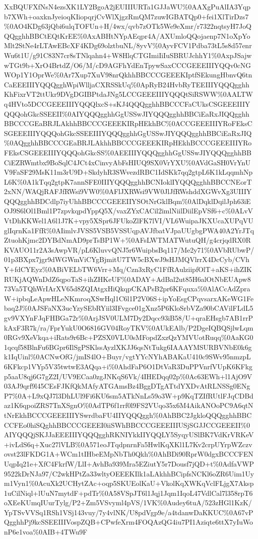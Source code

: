 \documentclass[]{article}
\begin{document}
XxBQUFXfNsN4ezsXK1LY2BgoA2jEUIIIURTa1GJJaWU\%0AAXgPuAlIA3Yqpb7XWh+oaxknJyeioqKIiopqrjCvWlXjgzRmQM7zuwIGBATQp0+fei1XlTirDzs7\%0AO4KDg63jQbi6ulqTOFUn+H/4wx/qvb7zOTk5We9eXmr/r7322nqtsyH7JoQQQgghhBBCtEQtKrEE\%0AxABHtNYpAEqpr4A/AXUmloQQojaenp7N1oXpYoMlt2StNe4rLTAwEBcXF4KDg69olztbuNL/8yvV\%0AyvFCV1Pdba73tL5s8d57enrWu6t1U/g91C83N7cr8sTNlqahn4+W8HlqCTGImiIiIuSBRUJchhY1\%0AxpJSajwwTGt9b+XrO4BrtdZ/O6/M/cD9AGFhYdEnTpywSaxCCCGEEEIIIYQQv0cNGWOp1Y1OprWe\%0Ar7Xup7XuV98nrQkhhBBCCCGEEEKIptfSEkungHbnvQ6tnCaEEEIIIYQQQgghWpiWlljaCXRSSkUq\%0ApRyB24HvbRyTEEIIIYQQQgghhKhFixrVT2ttUkr9DVgDGIBPtdaJNg5LCCGEEEIIIYQQQtSiRSWW\%0AALTWq4HVto5DCCGEEEIIIYQQQlxcS+sKJ4QQQgghhBBCCCFaCUksCSGEEEIIIYQQQohGkcSSEEII\%0AIYQQQgghhGgUSSwJIYQQQgghhBBCiEaRxJIQQgghhBBCCCGEaBRJLAkhhBBCCCGEEEKIRpHEkhBC\%0ACCGEEEIIIYRoFEksCSGEEEIIIYQQQohGkcSSEEIIIYQQQgghhGgUSSwJIYQQQgghhBBCiEaRxJIQ\%0AQgghhBBCCCGEaBRJLAkhhBBCCCGEEEKIRpHEkhBCCCGEEEIIIYRoFEksCSGEEEIIIYQQQohGkcSS\%0AEEIIIYQQQgghhGgUSSwJIYQQQgghhBBCiEZRWmtbx9BoSqlC4JCt4xCinvyAbFsHIUQ9SX0VrYXU\%0AVdGaSH0VrYnUV9FaSF29MsK11m3rU9D+SkdyhR3SWvezdRBC1IdSKk7qq2gtpL6K1kLqqmhNpL6K\%0A1kTqq2gtpK7annSFE0IIIYQQQgghhBCNIoklIYQQQgghhBBCCNEorT2xNN/WAQjRAFJfRWsi9VW0\%0AFlJXRWsi9VW0JlJfRWshddXGWvXg3UIIIYQQQgghhBDCdlp7iyUhhBBCCCGEEEIIYSOtNrGklBqm\%0AlDqklDqilJph63iEOJ9S6lOl1Bml1P7zpvkqpdYppQ5X/vaxZYxCACil2imlNiilDiilEpVSf6+c\%0ALvVVtDhKKWel1A6l1J7K+vpy5XSpr6JFUkoZlFK7lVI/VL6WuipaJKXUcaXUPqVUglIqrnKa1FfR\%0AIimlvJVSS5VSB5VSSUqpAVJfbatVJpaUUgbgPWA40A2YrJTqZtuohKjmc2DYBdNmAD9prTsBP1W+\%0AFsLWTMATWutuQH/g4crjqdRX0RKVAUO11r2A3sAwpVR/pL6KluvvQNJ5r6WuipbsBq117/Me2y71\%0AVbRUbwP/01p3BXpx7jgr9dWGWmViCYgBjmitU7TW5cBXwJ9sHJMQVlrrX4DcCyb/CVhY+fdCYEyz\%0ABiVELbTW6Vrr+Mq/Czn3xRyC1FfRAulziipfOlT+aKS+ihZIKRUKjAQWnDdZ6qpoTaS+ihZHKeUF\%0ADAY+AdBal2ut85H6alOtNbEUApw873Va5TQhWrIArXV65d8ZQIAtgxHiQkqpCKAPsB2pr6KFquxa\%0AlACcAdZpraW+ipbqLeApwHLeNKmroqXSwHql1C6l1P2V06S+ipYoEsgCPqvsarxAKeWG1Febaq2J\%0AJSFaNX3ucYzySEbRYiil3IFvgce01gXnz5P6KloSrbVZa90bCAVilFLdL5gv9VXYnFJqFHBGa72r\%0ArjJSV0ULM7Dy2Dqcc93iB58/U+qraEHsgb7AB1rrPkAxF3R7k/ra/FprYukU0O6816GV04RoyTKV\%0AUkEAlb/P2DgeIQBQSjlwLqm0RGv9XeVkqa+iRats9r6Bc+PZSX0VLU0sMFopdZxzQzYMVUotRuqq\%0AaKG01qcqf58BlnFu6BGpr6IlSgPSKlssAyzlXKJJ6qsNtTukg6IAAAYMSURBVNbE0k6gk1IqUinl\%0ACNwOfG/jmIS4lO+Buyr/vgtYYcNYhABAKaU410c9SWv95nmzpL6KFkcp1VYp5V35twtwE3AQqa+i\%0AhdFaP6O1DtVaR3DuPPVnrfVUpK6KFkgp5aaU8qj6G7gZ2I/UV9ECaa0zgJNKqS6Vk/4IHEDqq02p\%0Ac63EWh+l1AjO9V03AJ9qrf9l45CEsFJKfQkMAfyATGAmsBz4BggDTgATtdYXDvAtRLNSSg0ENgP7\%0A+L9xQJ7l3DhLUl9Fi6KU6sm5ATkNnLs59o3W+p9KqTZIfRUtlFJqCDBdaz1K6qpoiZRS7TnXSgnO\%0AdTP6f1rrf0l9FS2VUqo35x6M4AikANOoPC9A6qtNtNrEkhBCCCGEEEIIIYSwrdbaFU4IIYQQQggh\%0AhBBC2JgkloQQQgghhBBCCCFEo0hiSQghhBBCCCGEEEI0iiSWhBBCCCGEEEIIIUSjSGJJCCGEEEII\%0AIYQQQjSKJJaEEEIIIYQQQgghRKNIYkkIIYQQLY5SyqyUSlBK7VdKrVRKeV+ivLdS6q+Xuc27lVLB\%0A571eoJTqdpnrnFa5HwlKqXKl1L7Kv2crpUYrpWZczvovst23lFKDG1A+WCm1tIHbeEMpNbTh0Qkh\%0AhBDi90RprW0dgxBCCCFENUqpIq21e+XfC4FkrfW/LlI+AvhBa939Mra5EZiutY5r7Dousf7jQD+t\%0AdfaVWP9522kDrNJa97/C2wkHPtZa33wltyOEEEKIlk1aLAkhhBCipfsNCKl6oZR6Uim1Uym1Vyn1\%0AcuXk2UCHytZAc+oqp5SKUEolKaU+VkolKqXWKqVclFLjgX7Aksp1uCilNiql+lUuN7mytdF+pdTr\%0A58VSpJT6l1Jqj1Jqm1IqoL47VdlCal7l358rpT6oXEeKUmqIUurTylg/P2+Zm5VSvyml4pVS/1VK\%0Audey6tuA/523zHGl1KzK/YpTSvVVSq1RSh1VSj143vuy/7y4vlNK/U8pdVgp9e/a4tdanwDaKKUC\%0A67vPQgghhPj9kcSSEEIIIVospZQB+CPwfeXrm4FOQAzQG4iu7PI1Aziqte6ttX7yIuWonP6e1voa\%0AIB+4TWu9F
\end{document}
